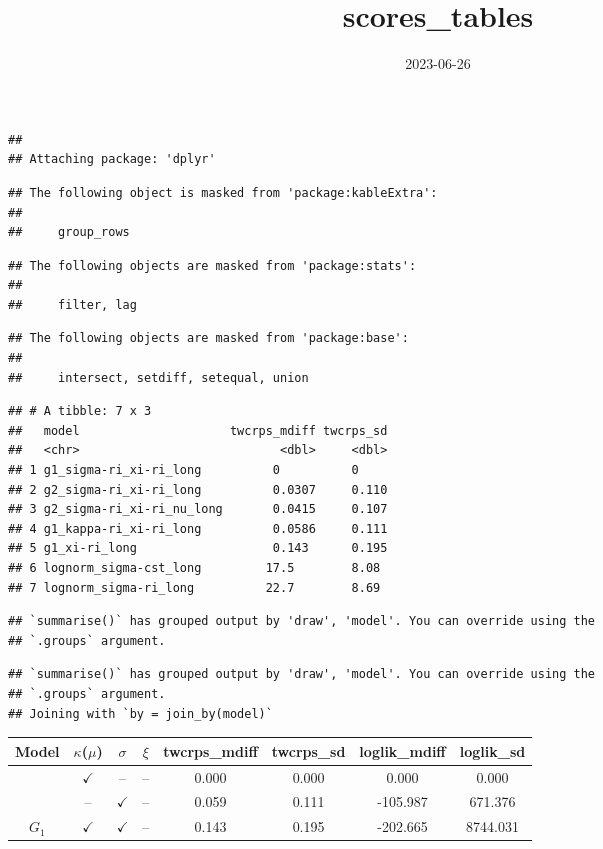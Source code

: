 \documentclass[
]{article}
\title{scores\_tables}
\author{}
\date{\vspace{-2.5em}2023-06-26}
\begin{document}
\maketitle

\begin{verbatim}
## 
## Attaching package: 'dplyr'
\end{verbatim}

\begin{verbatim}
## The following object is masked from 'package:kableExtra':
## 
##     group_rows
\end{verbatim}

\begin{verbatim}
## The following objects are masked from 'package:stats':
## 
##     filter, lag
\end{verbatim}

\begin{verbatim}
## The following objects are masked from 'package:base':
## 
##     intersect, setdiff, setequal, union
\end{verbatim}

\begin{verbatim}
## # A tibble: 7 x 3
##   model                     twcrps_mdiff twcrps_sd
##   <chr>                            <dbl>     <dbl>
## 1 g1_sigma-ri_xi-ri_long          0          0    
## 2 g2_sigma-ri_xi-ri_long          0.0307     0.110
## 3 g2_sigma-ri_xi-ri_nu_long       0.0415     0.107
## 4 g1_kappa-ri_xi-ri_long          0.0586     0.111
## 5 g1_xi-ri_long                   0.143      0.195
## 6 lognorm_sigma-cst_long         17.5        8.08 
## 7 lognorm_sigma-ri_long          22.7        8.69
\end{verbatim}

\begin{verbatim}
## `summarise()` has grouped output by 'draw', 'model'. You can override using the
## `.groups` argument.
\end{verbatim}

\begin{verbatim}
## `summarise()` has grouped output by 'draw', 'model'. You can override using the
## `.groups` argument.
## Joining with `by = join_by(model)`
\end{verbatim}

\begin{tabular}{cccccccc}
\toprule
Model & $\kappa$($\mu$) & $\sigma$ & $\xi$ & twcrps_mdiff & twcrps_sd & loglik_mdiff & loglik_sd\\
\midrule
 & $\checkmark$ & -- & -- & 0.000 & 0.000 & 0.000 & 0.000\\

 & -- & $\checkmark$ & -- & 0.059 & 0.111 & -105.987 & 671.376\\

\multirow{-3}{*}{\centering\arraybackslash $G_1$} & $\checkmark$ & $\checkmark$ & -- & 0.143 & 0.195 & -202.665 & 8744.031\\
\bottomrule
\end{tabular}
\end{document}
